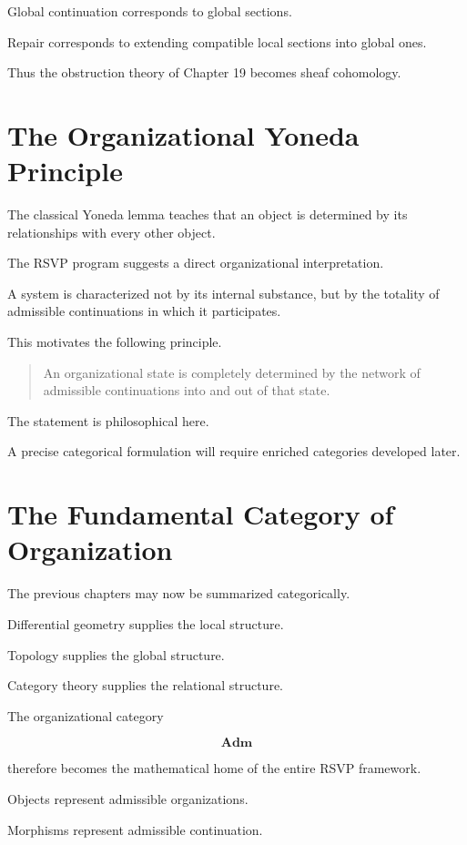 \documentclass[11pt,oneside]{book}
\numberwithin{equation}{chapter}
\theoremstyle{definition}
\theoremstyle{plain}
\begin{document}
Global continuation corresponds to global sections.

Repair corresponds to extending compatible local sections into global ones.

Thus the obstruction theory of Chapter 19 becomes sheaf cohomology.

\section{The Organizational Yoneda Principle}

The classical Yoneda lemma teaches that an object is determined by its
relationships with every other object.

The RSVP program suggests a direct organizational interpretation.

A system is characterized not by its internal substance, but by the totality
of admissible continuations in which it participates.

This motivates the following principle.

\begin{quote}

An organizational state is completely determined by the network of
admissible continuations into and out of that state.

\end{quote}

The statement is philosophical here.

A precise categorical formulation will require enriched categories developed
later.

\section{The Fundamental Category of Organization}

The previous chapters may now be summarized categorically.

Differential geometry supplies the local structure.

Topology supplies the global structure.

Category theory supplies the relational structure.

The organizational category

\[
\mathbf{Adm}
\]

therefore becomes the mathematical home of the entire RSVP framework.

Objects represent admissible organizations.

Morphisms represent admissible continuation.
\end{document}

